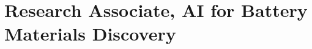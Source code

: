 \documentclass[a4paper,11pt]{article}
\author{Cole Fuerth}
\date{\today}{I}
\begin{document}
\maketitle
%
%
\section{Research Associate, AI for Battery Materials Discovery}
% 

% 
% 
% 
% 
% 
% 
% 
\par
\dotline
\vspace{\baselineskip}
%

%
% 
%
%
\end{document}

